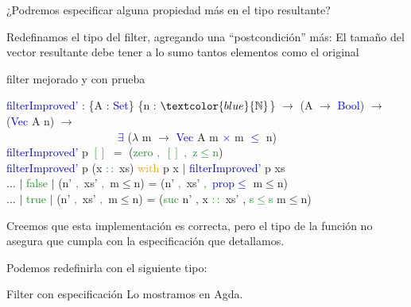 \documentclass[xcolor=dvipsnames]{beamer} %
\newcommand{\cf}[1]{\textcolor{blue}{#1}}
\newcommand{\ct}[1]{\textcolor{blue}{#1}}
\newcommand{\cc}[1]{\textcolor{ForestGreen}{#1}}
\newcommand{\ck}[1]{\textcolor{orange}{#1}}
\newcommand{\N}{\ct{\mathbb{N}}}
\newcommand{\ra}{\rightarrow}
\newcommand{\T}{ \ \ \ \ }
\begin{document}
\begin{frame}

\begin{block}{}
  ¿Podremos especificar alguna propiedad más en el tipo resultante?
\end{block}

\pause

  \begin{block}{}
    Redefinamos el tipo del filter, agregando una ``postcondición'' más: El tamaño
    del vector resultante debe tener a lo sumo tantos elementos como el original
  \end{block}
  
  \pause

  \begin{block}{filter mejorado y con prueba}

  \cf{filterImproved'} : \{A : \ct{Set}\} \{n : $\N$\} $\ra$
  (A $\ra$ \ct{Bool}) $\ra$ (\ct{Vec} A n) $\ra$\\
  \T \T \T \T \ \ 
  \ct{$\exists$} ($\lambda$ m $\ra$ \ct{Vec} A m \ct{$\times$} m \ct{$\leq$} n)\\
  \pause
  \cf{filterImproved'} p \cc{$[]$} $=$ (\cc{zero} \cc{$,$} \cc{$[]$} \cc{$,$} \cc{z$\leq$n})\\
  \cf{filterImproved'} p (x \cc{$::$} xs) \ck{with} p x $|$ \cf{filterImproved'} p xs\\
  $\ldots$ $|$ \cc{false} $|$ (n' \cc{$,$} xs' \cc{$,$} m$\leq$n) = 
  (n' \cc{$,$} xs' \cc{$,$} \cf{prop$\leq$} m$\leq$n)\\
  $\ldots$ $|$ \cc{true}  $|$ (n' \cc{$,$} xs' \cc{$,$} m$\leq$n) = 
  (\cc{suc} n' , x \cc{$::$} xs' , \cc{s$\leq$s} m$\leq$n)

  \end{block}
  
\end{frame}

\begin{frame}

\begin{block}{}
  Creemos que esta implementación es correcta, pero el tipo de la función no asegura que cumpla
  con la especificación que detallamos.
  
  Podemos redefinirla con el siguiente tipo:
\end{block}

\begin{block}{Filter con especificación}
  Lo mostramos en Agda.
\end{block}

\end{frame}
\end{document}
